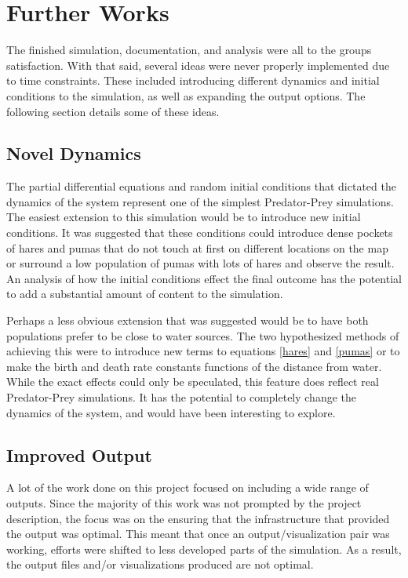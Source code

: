 \documentclass[a4paper,11pt]{article}
\begin{document}
\section{Further Works}

The finished simulation, documentation, and analysis were all to the groups satisfaction.  With that said, several ideas were never properly implemented due to time constraints.  These included introducing different dynamics and initial conditions to the simulation, as well as expanding the output options.  The following section details some of these ideas.

\subsection{Novel Dynamics}

The partial differential equations and random initial conditions that dictated the dynamics of the system represent one of the simplest Predator-Prey simulations.  The easiest extension to this simulation would be to introduce new initial conditions.  It was suggested that these conditions could introduce dense pockets of hares and pumas that do not touch at first on different locations on the map or surround a low population of pumas with lots of hares  and observe the result.  An analysis of how the initial conditions effect the final outcome has the potential to add a substantial amount of content to the simulation.  

Perhaps a less obvious extension that was suggested would be to have both populations prefer to be close to water sources.  The two hypothesized methods of achieving this were to introduce new terms to equations \eqref{hares} and \eqref{pumas} or to make the birth and death rate constants functions of the distance from water.  While the exact effects could only be speculated, this feature does reflect real Predator-Prey simulations.  It has the potential to completely change the dynamics of the system, and would have been interesting to explore.

\subsection{Improved Output}

A lot of the work done on this project focused on including a wide range of outputs.  Since the majority of this work was not prompted by the project description, the focus was on the ensuring that the infrastructure that provided the output was optimal.  This meant that once an output/visualization pair was working, efforts were shifted to less developed parts of the simulation.  As a result, the output files and/or visualizations produced are not optimal.  
\end{document}
